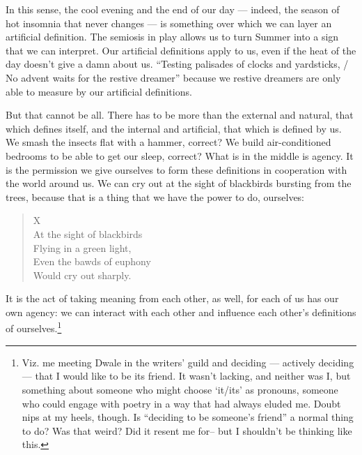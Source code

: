 \documentclass[12pt]{memoir}
\begin{document}
In this sense, the cool evening and the end of our day --- indeed, the season of hot insomnia that never changes --- is something over which we can layer an artificial definition. The semiosis in play allows us to turn Summer into a sign that we can interpret. Our artificial definitions apply to us, even if the heat of the day doesn't give a damn about us. ``Testing palisades of clocks and yardsticks, / No advent waits for the restive dreamer'' because we restive dreamers are only able to measure by our artificial definitions.

But that cannot be all. There has to be more than the external and natural, that which defines itself, and the internal and artificial, that which is defined by us. We smash the insects flat with a hammer, correct? We build air-conditioned bedrooms to be able to get our sleep, correct? What is in the middle is agency. It is the permission we give ourselves to form these definitions in cooperation with the world around us. We can cry out at the sight of blackbirds bursting from the trees, because that is a thing that we have the power to do, ourselves:

\begin{verse}
X \\
At the sight of blackbirds \\
Flying in a green light, \\
Even the bawds of euphony \\
Would cry out sharply.

\parencite{blackbird}
\end{verse}

It is the act of taking meaning from each other, as well, for each of us has our own agency: we can interact with each other and influence each other's definitions of ourselves.\footnote{Viz. me meeting Dwale in the writers' guild and deciding --- actively deciding --- that I would like to be its friend. It wasn't lacking, and neither was I, but something about someone who might choose `it/its' as pronouns, someone who could engage with poetry in a way that had always eluded me. Doubt nips at my heels, though. Is ``deciding to be someone's friend'' a normal thing to do? Was that weird? Did it resent me for-- but I shouldn't be thinking like this.}
\end{document}
